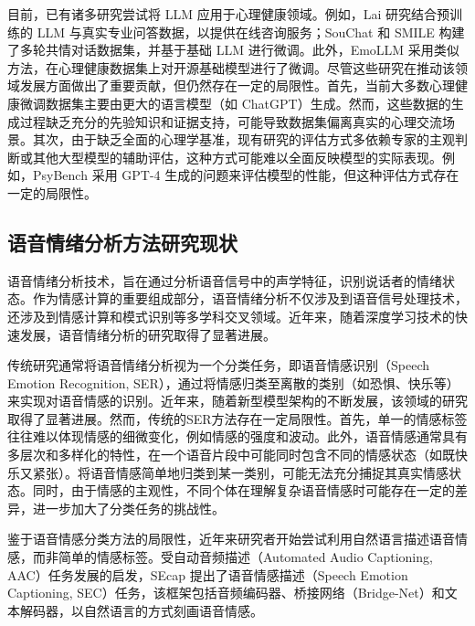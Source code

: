 目前，已有诸多研究尝试将 LLM 应用于心理健康领域。例如，Lai\cite{Lai_Shi_Du_Wu_Fu_Dou_Wang_2023} 研究结合预训练的 LLM 与真实专业问答数据，以提供在线咨询服务；SouChat\cite{Chen_Xing_Lin_Zheng_Wang_Liu_Xu_2023} 和 SMILE\cite{Qiu_He_Zhang_Li_Lan_2023} 构建了多轮共情对话数据集，并基于基础 LLM 进行微调。此外，EmoLLM\cite{yang2024emollmmultimodalemotionalunderstanding} 采用类似方法，在心理健康数据集上对开源基础模型进行了微调。尽管这些研究在推动该领域发展方面做出了重要贡献，但仍然存在一定的局限性。首先，当前大多数心理健康微调数据集主要由更大的语言模型（如 ChatGPT）生成。然而，这些数据的生成过程缺乏充分的先验知识和证据支持，可能导致数据集偏离真实的心理交流场景。其次，由于缺乏全面的心理学基准，现有研究的评估方式多依赖专家的主观判断或其他大型模型的辅助评估，这种方式可能难以全面反映模型的实际表现。例如，PsyBench\cite{Zhang_He_Song_He_Zhang_Qiu_Li_Ma_Lan_2023} 采用 GPT-4\cite{Achiam_Adler_Agarwal_Ahmad_Akkaya_Aleman_Almeida_Altenschmidt_Altman_Anadkat_et} 生成的问题来评估模型的性能，但这种评估方式存在一定的局限性。


\subsection{语音情绪分析方法研究现状}

语音情绪分析技术，旨在通过分析语音信号中的声学特征，识别说话者的情绪状态。作为情感计算的重要组成部分，语音情绪分析不仅涉及到语音信号处理技术，还涉及到情感计算和模式识别等多学科交叉领域。近年来，随着深度学习技术的快速发展，语音情绪分析的研究取得了显著进展。

传统研究通常将语音情绪分析视为一个分类任务，即语音情感识别（Speech Emotion Recognition, SER），通过将情感归类至离散的类别（如恐惧、快乐等）来实现对语音情感的识别\cite{El_Ayadi_Kamel_Karray_2011}\cite{Nwe_Foo_De_Silva_2003}\cite{Jiang_Fu_Tao_Lei_Zhao_2019}。近年来，随着新型模型架构的不断发展，该领域的研究取得了显著进展。然而，传统的SER方法存在一定局限性。首先，单一的情感标签往往难以体现情感的细微变化，例如情感的强度和波动。此外，语音情感通常具有多层次和多样化的特性，在一个语音片段中可能同时包含不同的情感状态（如既快乐又紧张）。将语音情感简单地归类到某一类别，可能无法充分捕捉其真实情感状态。同时，由于情感的主观性，不同个体在理解复杂语音情感时可能存在一定的差异，进一步加大了分类任务的挑战性。

鉴于语音情感分类方法的局限性，近年来研究者开始尝试利用自然语言描述语音情感，而非简单的情感标签。受自动音频描述（Automated Audio Captioning, AAC）\cite{Ye_Wang_Yang_Zou_2021}任务发展的启发，SEcap\cite{xu2024secap} 提出了语音情感描述（Speech Emotion Captioning, SEC）任务，该框架包括音频编码器、桥接网络（Bridge-Net）和文本解码器，以自然语言的方式刻画语音情感。

